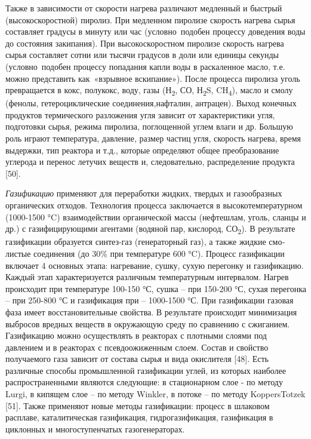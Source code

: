 \begin{multicols}{2}
Также в зависимости от скорости нагрева различают медленный и быстрый
(высокоскоростной) пиролиз. При медленном пиролизе скорость нагрева
сырья составляет градусы в минуту или час (условно~подобен процессу
доведения воды до состояния закипания). При высокоскоростном пиролизе
скорость нагрева сырья составляет сотни или тысячи градусов в доли или
единицы секунды (условно~подобен процессу попадания капли воды в
раскаленное масло, т.е. можно представить как~«взрывное вскипание»).
После процесса пиролиза уголь превращается в кокс, полукокс, воду, газы
(Н\textsubscript{2}, СО, Н\textsubscript{2}S, CH\textsubscript{4}),
масло и смолу (фенолы, гетероциклические соединения,нафталин, антрацен).
Выход конечных продуктов термического разложения угля зависит от
характеристики угля, подготовки сырья, режима пиролиза, поглощенной
углем влаги и др. Большую роль играют температура, давление, размер
частиц угля, скорость нагрева, время выдержки, тип реактора и т.д.,
которые определяют общее преобразование углерода и перенос летучих
веществ и, следовательно, распределение продукта {[}50{]}.

\emph{Газификацию} применяют для переработки жидких, твердых и
газообразных органических отходов. Технология процесса заключается в
высокотемператур­ном (1000-1500 °C) взаимодействии органической массы
(нефтешлам, уголь, сланцы и др.) с газифицирующими агентами (водяной
пар, кислород, СО\textsubscript{2}). В результате газификации образуется
синтез-газ (генера­торный газ), а также жидкие смо­листые соединения (до
30\% при температуре 600 °C). Процесс газификации включает 4 основных
этапа: нагревание, сушку, сухую перегонку и газифика­цию. Каждый этап
характеризуется различным температурным интервалом. Нагрев происходит
при темпе­ратуре 100-150 °С, сушка -- при 150-200 °С, сухая пере­гонка --
при 250-800 °С и газификация при -- 1000-1500 °С. При газификации
газовая фаза имеет восстановительные свойства. В результате происходит
минимизация выбросов вредных веществ в окружающую среду по сравнению с
сжиганием. Газификацию можно осуществлять в реакторах с плотными слоями
под давлением и в реакторах с псев­доожиженным слоем. Состав и свойство
получаемого газа зависит от состава сырья и вида окислителя {[}48{]}.
Есть различные способы промышленной газификации углей, из которых
наиболее распространенными являются следующие: в стационарном слое - по
методу Lurgi, в кипящем слое -- по методу Winkler, в потоке -- по методу
KoppersTotzek {[}51{]}. Также применяют новые методы газификации:
процесс в шлаковом расплаве, каталитическая газификация,
гидрогазификация, газификация в циклонных и многоступенчатых
газогенераторах.


\end{multicols}
